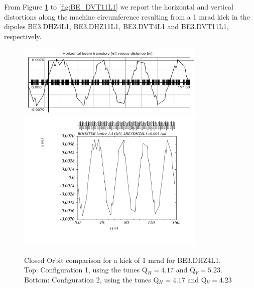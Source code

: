 \documentclass[11pt,letter,english]{article}
\begin{document}
From Figure \ref{fig:BE_DHZ4L1} to \ref{fig:BE_DVT11L1} we report the horizontal
and vertical distortions along the machine circumference resulting from a 1 mrad
kick in the dipoles BE3.DHZ4L1, BE3.DHZ11L1, BE3.DVT4L1 and BE3.DVT11L1,
respectively.


\begin{figure}[!hbtp]
  \begin{center}
    \includegraphics[width=0.8\textwidth]{figs/LINC-BE_DHZ4L1.png}
    \includegraphics[width=0.8\textwidth]{figs/psb_orbit_kBE3DHZ4L1at0p001rad_l2014tobias.pdf}
    \caption{Closed Orbit comparison for a kick of 1 mrad for BE3.DHZ4L1. Top: Configuration 1, using the tunes Q$_H=4.17$ and Q$_V=5.23$. Bottom: Configuration 2, using the tunes Q$_H=4.17$ and Q$_V=4.23$}
    \label{fig:BE_DHZ4L1}
  \end{center}
\end{figure}
\end{document}
